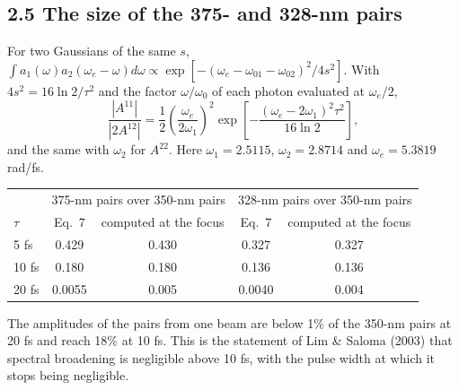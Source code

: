 \documentclass[10pt]{article}
\begin{document}
\subsection*{2.5 The size of the 375- and 328-nm pairs}
For two Gaussians of the same $s$, $\int a_1(\omega)a_2(\omega_e-\omega)d\omega \propto
\exp[-(\omega_e-\omega_{01}-\omega_{02})^2/4s^2]$. With $4s^2 = 16\ln 2/\tau^2$ and the factor $\omega/\omega_0$ of
each photon evaluated at $\omega_e/2$,
\begin{equation}\frac{|A^{11}|}{|2A^{12}|} = \frac12\left(\frac{\omega_e}{2\omega_1}\right)^2
\exp\!\left[-\frac{(\omega_e-2\omega_1)^2\tau^2}{16\ln 2}\right],\end{equation}
and the same with $\omega_2$ for $A^{22}$. Here $\omega_1 = 2.5115$, $\omega_2 = 2.8714$ and $\omega_e = 5.3819$
rad/fs.
\begin{center}\small\begin{tabular}{lcccc}\toprule
 & \multicolumn{2}{c}{375-nm pairs over 350-nm pairs} & \multicolumn{2}{c}{328-nm pairs over 350-nm pairs}\\
$\tau$ & Eq.~7 & computed at the focus & Eq.~7 & computed at the focus\\\midrule
5 fs & 0.429 & 0.430 & 0.327 & 0.327\\
10 fs & 0.180 & 0.180 & 0.136 & 0.136\\
20 fs & 0.0055 & 0.005 & 0.0040 & 0.004\\\bottomrule\end{tabular}\end{center}
The amplitudes of the pairs from one beam are below 1\% of the 350-nm pairs at 20 fs and reach 18\% at 10 fs. This is
the statement of Lim \& Saloma (2003) that spectral broadening is negligible above 10 fs, with the pulse width at
which it stops being negligible.
\end{document}
